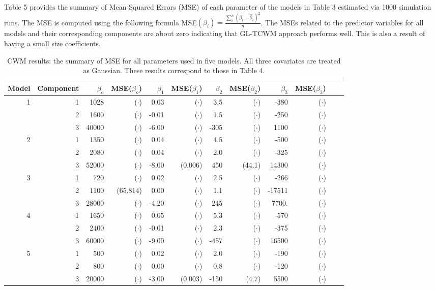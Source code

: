 \documentclass[11pt,letterpaper]{article}
\numberwithin{equation}{section}
\numberwithin{equation}{section}
\numberwithin{equation}{section}
\begin{document}
Table 5 provides the summary of Mean Squared Errors (MSE) of each parameter of the models in Table 3 estimated via 1000 simulation runs. The MSE is computed using the following formula MSE$(\beta_i) = \frac{\sum_i^n (\beta_i - \hat\beta_i ) ^2}{n}$. The MSEs related to the predictor variables for all models and their corresponding components are about zero indicating that  GL-TCWM approach performs well. This is also a result of having a small size coefficients.


\begin{table}[!htb]
\centering
\caption{CWM results: the summary of MSE for all parameters used in five models. All three covariates are treated as Gaussian. These results correspond to those in Table 4.}
\label{my-label}
\begin{tabular}{rrrrrrrrrrrr}
\hline\hline
Model & Component & $\beta_o$ &  MSE($\beta_o$)   &  $\beta_1$ & MSE($\beta_1$)& $\beta_2$ &MSE($\beta_2$)   & $\beta_3$ &  MSE($\beta_3$)  \\
\hline
1     & 1         & 1028& ($\cdot$)   & 0.03&  ($\cdot$)   & 3.5&  ($\cdot$)    & -380&  ($\cdot$)    \\
      & 2         & 1600&  ($\cdot$)      & -0.01& ($\cdot$)  & 1.5& ($\cdot$)     & -250& ($\cdot$)  \\
      & 3         & 40000& ($\cdot$)     & -6.00& ($\cdot$)  & -305& ($\cdot$)  & 1100& ($\cdot$)    \\
2     & 1         & 1350& ($\cdot$)     & 0.04& ($\cdot$) & 4.5& ($\cdot$)    & -500& ($\cdot$)  \\
      & 2         & 2080&  ($\cdot$)    & 0.04& ($\cdot$)   & 2.0& ($\cdot$)     & -325& ($\cdot$)   \\
      & 3         & 52000&  ($\cdot$)     & -8.00& (0.006)  & 450& (44.1)   & 14300& ($\cdot$)  \\
3     & 1         & 720&  ($\cdot$)     & 0.02& ($\cdot$)   & 2.5& ($\cdot$)    & -266& ($\cdot$)    \\
      & 2         & 1100&  (65.814)     & 0.00& ($\cdot$)   & 1.1& ($\cdot$)     & -17511& ($\cdot$)  \\
      & 3         & 28000& ($\cdot$)   & -4.20& ($\cdot$)  & 245& ($\cdot$)   & 7700.& ($\cdot$)  \\
4     & 1         & 1650& ($\cdot$)    & 0.05& ($\cdot$)  & 5.3& ($\cdot$)    & -570& ($\cdot$)  \\
      & 2         & 2400&  ($\cdot$)     & -0.01& ($\cdot$)  & 2.3& ($\cdot$)    & -375& ($\cdot$)    \\
      & 3         & 60000&  ($\cdot$)     & -9.00& ($\cdot$)  & -457& ($\cdot$)  & 16500& ($\cdot$)   \\
5     & 1         & 500&  ($\cdot$)     & 0.02& ($\cdot$)   & 2.0& ($\cdot$)   & -190& ($\cdot$)  \\
      & 2         & 800&  ($\cdot$)      & 0.00& ($\cdot$)   & 0.8& ($\cdot$)    & -120& ($\cdot$)  \\
      & 3         & 20000&  ($\cdot$)     & -3.00& (0.003)  & -150& (4.7) & 5500& ($\cdot$) \\
      \hline\hline
\end{tabular}
\end{table}
\end{document}
